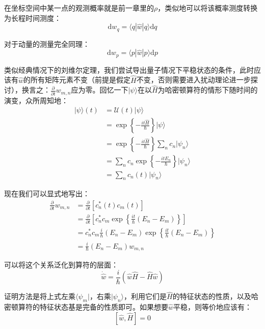 \documentclass[UTF8]{ctexart}
\begin{document}
\begin{spacing}{2.0}
在坐标空间中某一点的观测概率就是前一章里的$\rho$，类似地可以将该概率测度转换为长程时间测度：
\begin{equation}
\text{d}w_{q} = \langle q |\hat{w}|q\rangle \text{d}q
\end{equation}

对于动量的测量完全同理：
\begin{equation}
\text{d}w_{p} = \langle p |\hat{w}|p\rangle \text{d}p
\end{equation}

类似经典情况下的刘维尔定理，我们尝试导出量子情况下平稳状态的条件，此时应该有$\hat{w}$的所有矩阵元素不变（前提是假定$\hat{H}$不变，否则需要进入扰动理论进一步探讨），换言之：$\frac{\partial}{\partial t} w_{m,n}$应为零。回忆一下$|\psi\rangle$在以$\hat{H}$为哈密顿算符的情形下随时间的演变，众所周知地：
\begin{equation}
\begin{aligned}
|\psi\rangle(t) &= \mathcal{U}(t)|\psi\rangle \\
&=\exp \left\{-\frac{it\hat{H}}{\hbar} \right\}|\psi\rangle \\
&=\exp \left\{-\frac{it\hat{H}}{\hbar} \right\}\sum_{n}c_{n}|\psi_{n}\rangle \\
&=\sum_{n}c_{n}\exp \left\{-\frac{itE_{n}}{\hbar} \right\}|\psi_{n}\rangle \\
&=\sum_{n}c_{n}(t)| \psi_{n}\rangle 
\end{aligned}
\end{equation}

现在我们可以显式地写出：
\begin{equation}
\begin{aligned}
\frac{\partial}{\partial t}w_{m,n}&=\frac{\partial}{\partial t}\left[ c^{*}_{n}(t)c_{m}(t) \right] \\
&=\frac{\partial}{\partial t}\left[ c^{*}_{n}c_{m}\exp\left\{\frac{it}{\hbar}(E_{n}-E_{m}) \right\} \right] \\
&= c^{*}_{n}c_{m}\frac{i}{\hbar}(E_{n}-E_{m})\exp\left\{\frac{it}{\hbar}(E_{n}-E_{m}) \right\} \\
&=\frac{i}{\hbar}(E_{n}-E_{m}) w_{m,n}
\end{aligned}
\end{equation}

可以将这个关系泛化到算符的层面：
\begin{equation}
\dot{\hat{w}}=\frac{i}{\hbar}(\hat{w}\hat{H}-\hat{H}\hat{w})
\end{equation}

证明方法是将上式左乘$\langle \psi_{m}|$，右乘$|\psi_{n} \rangle$，利用它们是$\hat{H}$的特征状态的性质，以及哈密顿算符的特征状态基是完备的性质即可。如果想要$\hat{w}$平稳，则等价地应该有：
\begin{equation}
\left[ \hat{w},\hat{H}\right] =0
\end{equation}


\end{spacing}
\end{document}
